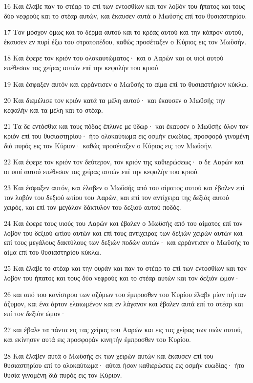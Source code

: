 \par 16 Και έλαβε παν το στέαρ το επί των εντοσθίων και τον λοβόν του ήπατος και τους δύο νεφρούς και το στέαρ αυτών, και έκαυσεν αυτά ο Μωϋσής επί του θυσιαστηρίου.
\par 17 Τον μόσχον όμως και το δέρμα αυτού και το κρέας αυτού και την κόπρον αυτού, έκαυσεν εν πυρί έξω του στρατοπέδου, καθώς προσέταξεν ο Κύριος εις τον Μωϋσήν.
\par 18 Και έφερε τον κριόν του ολοκαυτώματος· και ο Ααρών και οι υιοί αυτού επέθεσαν τας χείρας αυτών επί την κεφαλήν του κριού.
\par 19 Και έσφαξεν αυτόν και ερράντισεν ο Μωϋσής το αίμα επί το θυσιαστήριον κύκλω.
\par 20 Και διεμέλισε τον κριόν κατά τα μέλη αυτού· και έκαυσεν ο Μωϋσής την κεφαλήν και τα μέλη και το στέαρ.
\par 21 Τα δε εντόσθια και τους πόδας έπλυνε με ύδωρ· και έκαυσεν ο Μωϋσής όλον τον κριόν επί του θυσιαστηρίου· ήτο ολοκαύτωμα εις οσμήν ευωδίας, προσφορά γινομένη διά πυρός εις τον Κύριον· καθώς προσέταξεν ο Κύριος εις τον Μωϋσήν.
\par 22 Και έφερε τον κριόν τον δεύτερον, τον κριόν της καθιερώσεως· ο δε Ααρών και οι υιοί αυτού επέθεσαν τας χείρας αυτών επί την κεφαλήν του κριού.
\par 23 Και έσφαξεν αυτόν, και έλαβεν ο Μωϋσής από του αίματος αυτού και έβαλεν επί τον λοβόν του δεξιού ωτίου του Ααρών, και επί τον αντίχειρα της δεξιάς αυτού χειρός, και επί τον μεγάλον δάκτυλον του δεξιού αυτού ποδός.
\par 24 Και έφερε τους υιούς του Ααρών και έβαλεν ο Μωϋσής από του αίματος επί τον λοβόν του δεξιού ωτίου αυτών και επί τους αντίχειρας των δεξιών χειρών αυτών και επί τους μεγάλους δακτύλους των δεξιών ποδών αυτών· και ερράντισεν ο Μωϋσής το αίμα επί του θυσιαστηρίου κύκλω.
\par 25 Και έλαβε το στέαρ και την ουράν και παν το στέαρ το επί των εντοσθίων και τον λοβόν του ήπατος και τους δύο νεφρούς και το στέαρ αυτών και τον δεξιόν ώμον·
\par 26 και από του κανίστρου των αζύμων του έμπροσθεν του Κυρίου έλαβε μίαν πήτταν άζυμον, και ένα άρτον ελαιωμένον και εν λάγανον και έβαλεν αυτά επί το στέαρ και επί τον δεξιόν ώμον·
\par 27 και έβαλε τα πάντα εις τας χείρας του Ααρών και εις τας χείρας των υιών αυτού, και εκίνησεν αυτά εις προσφοράν κινητήν έμπροσθεν του Κυρίου.
\par 28 Και έλαβεν αυτά ο Μωϋσής εκ των χειρών αυτών και έκαυσεν επί του θυσιαστηρίου επί το ολοκαύτωμα· αύται ήσαν καθιερώσεις εις οσμήν ευωδίας· ήτο θυσία γινομένη διά πυρός εις τον Κύριον.
